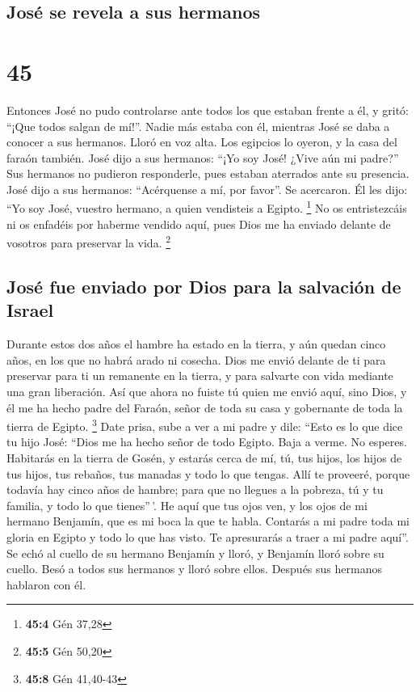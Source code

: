 \hypertarget{josuxe9-se-revela-a-sus-hermanos}{%
\subsection{José se revela a sus
hermanos}\label{josuxe9-se-revela-a-sus-hermanos}}

\hypertarget{section-44}{%
\section{45}\label{section-44}}

 Entonces José no pudo controlarse ante todos los que
estaban frente a él, y gritó: ``¡Que todos salgan de mí!''. Nadie más
estaba con él, mientras José se daba a conocer a sus hermanos.
 Lloró en voz alta. Los egipcios lo oyeron, y la casa del
faraón también.  José dijo a sus hermanos: ``¡Yo soy José!
¿Vive aún mi padre?'' Sus hermanos no pudieron responderle, pues estaban
aterrados ante su presencia.  José dijo a sus hermanos:
``Acérquense a mí, por favor''. Se acercaron. Él les dijo: ``Yo soy
José, vuestro hermano, a quien vendisteis a Egipto. \footnote{\textbf{45:4}
  Gén 37,28}  No os entristezcáis ni os enfadéis por
haberme vendido aquí, pues Dios me ha enviado delante de vosotros para
preservar la vida. \footnote{\textbf{45:5} Gén 50,20}

\hypertarget{josuxe9-fue-enviado-por-dios-para-la-salvaciuxf3n-de-israel}{%
\subsection{José fue enviado por Dios para la salvación de
Israel}\label{josuxe9-fue-enviado-por-dios-para-la-salvaciuxf3n-de-israel}}

 Durante estos dos años el hambre ha estado en la tierra,
y aún quedan cinco años, en los que no habrá arado ni cosecha.
 Dios me envió delante de ti para preservar para ti un
remanente en la tierra, y para salvarte con vida mediante una gran
liberación.  Así que ahora no fuiste tú quien me envió
aquí, sino Dios, y él me ha hecho padre del Faraón, señor de toda su
casa y gobernante de toda la tierra de Egipto. \footnote{\textbf{45:8}
  Gén 41,40-43}  Date prisa, sube a ver a mi padre y dile:
``Esto es lo que dice tu hijo José: ``Dios me ha hecho señor de todo
Egipto. Baja a verme. No esperes.  Habitarás en la tierra
de Gosén, y estarás cerca de mí, tú, tus hijos, los hijos de tus hijos,
tus rebaños, tus manadas y todo lo que tengas.  Allí te
proveeré, porque todavía hay cinco años de hambre; para que no llegues a
la pobreza, tú y tu familia, y todo lo que tienes''\,'. 
He aquí que tus ojos ven, y los ojos de mi hermano Benjamín, que es mi
boca la que te habla.  Contarás a mi padre toda mi gloria
en Egipto y todo lo que has visto. Te apresurarás a traer a mi padre
aquí''.  Se echó al cuello de su hermano Benjamín y
lloró, y Benjamín lloró sobre su cuello.  Besó a todos
sus hermanos y lloró sobre ellos. Después sus hermanos hablaron con él.

